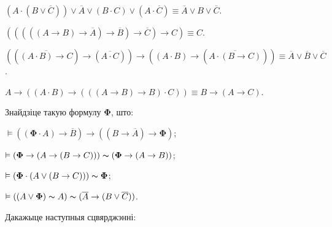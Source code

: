 \begin{problemList}
\begin{belarusianEnumerate}

\item $(A \cdot (B \vee \overline{C})) \vee \overline{A} \vee (B \cdot C) \vee
(A \cdot \overline{C}) \equiv \overline{A} \vee B \vee \overline{C}$.

\item $(((((A \to B) \to \overline{A}) \to \overline{B}) \to \overline{C}) \to C)
\equiv C$.

\item $((\overline{(A \cdot B) \to C}) \to (\overline{A \cdot C})) \to ((A \cdot B) \to
(\overline{A \cdot (B \to C)})) \equiv \overline{A} \vee \overline{B} \vee \overline{C}$.

\item $A \to ((A \cdot B) \to (((A \to B) \to B) \cdot C)) \equiv B \to (A \to C)$.

\end{belarusianEnumerate}

\smallskip

\item
Знайдзіце такую формулу $\boldsymbol{\Phi}$, што: \\

\begin{belarusianEnumerate}

\item $\vDash ((\boldsymbol{\Phi} \cdot A) \to \overline{B}) \to
((B \to \overline{A}) \to \boldsymbol{\Phi})$;

\item $\vDash (\boldsymbol{\Phi} \to (A \to (B \to C))) \thicksim (\boldsymbol{\Phi} \to (A \to B))$;

\item $\vDash (\boldsymbol{\Phi} \cdot (A \vee (B \to C))) \thicksim \boldsymbol{\Phi}$;

\item $\vDash ((A \vee \boldsymbol{\Phi}) \thicksim A) \thicksim (\overline{A} \to
(B \vee \overline{C}))$.

\end{belarusianEnumerate}

\smallskip

\item
Дакажыце наступныя сцвярджэнні: \\

\begin{belarusianEnumerate}


\end{belarusianEnumerate}
\end{problemList}
